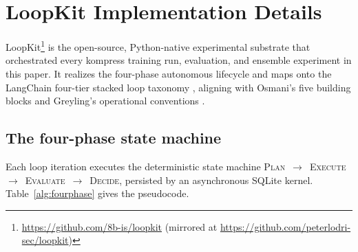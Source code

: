\section{LoopKit Implementation Details}
\label{sec:loopkit}

LoopKit\footnote{\url{https://github.com/8b-is/loopkit} (mirrored at
\url{https://github.com/peterlodri-sec/loopkit})} is the
open-source, Python-native experimental substrate that orchestrated every
kompress training run, evaluation, and ensemble experiment in this paper. It
realizes the four-phase autonomous lifecycle and maps onto the LangChain
four-tier stacked loop taxonomy \citep{langchain2026loops}, aligning with
Osmani's five building blocks \citep{osmani2026loop} and Greyling's
operational conventions \citep{greyling2026loop}.

\subsection{The four-phase state machine}
\label{sec:loopkit:phases}

Each loop iteration executes the deterministic state machine
\textsc{Plan}~$\to$~\textsc{Execute}~$\to$~\textsc{Evaluate}~$\to$~\textsc{Decide},
persisted by an asynchronous SQLite kernel. Table~\ref{alg:fourphase}
gives the pseudocode.

